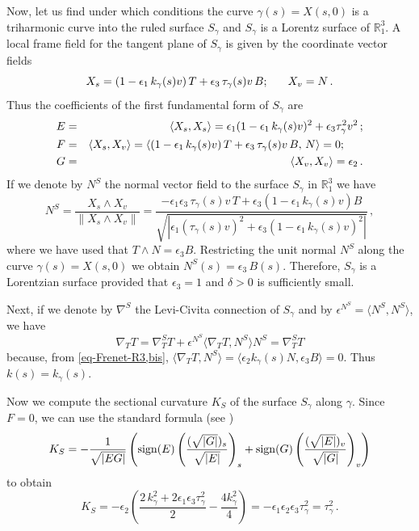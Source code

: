\documentclass[11pt]{amsart}
\theoremstyle{plain}
\theoremstyle{definition}
\numberwithin{equation}{section}
\def \R{{\mathbb R}}
\begin{document}
Now, let us find  under which conditions the curve $\gamma(s)=X(s,0)$ is a triharmonic curve into the ruled surface $S_{\gamma}$ and $S_{\gamma}$ is a Lorentz surface of $\R_1^3$.  
A local frame field for the tangent plane of $S_\gamma$ is given by the coordinate vector fields
\[
X_s =  (1 - \epsilon_1\,k_\gamma(s)v) \, T + \epsilon_3 \, \tau_\gamma(s) v\, B; \hspace{6 mm} X_v = N\,.
\]
Thus the coefficients of the first fundamental form of $S_\gamma$ are
\begin{eqnarray}\label{eq-S-firstFF}\nonumber
 E&=& \langle X_s, X_s \rangle = \epsilon_1 (1 - \epsilon_1\,k_\gamma(s)v)^2 + \epsilon_3 \tau_\gamma^2 v^2\,;\\
F &=& \langle X_s, X_v \rangle = \langle (1 - \epsilon_1\,k_\gamma(s)v) \, T + \epsilon_3 \, \tau_\gamma(s) v\, B, \, N \rangle = 0; \hspace{6 mm} \\\nonumber
G &=& \langle X_v, X_v \rangle = \epsilon_2\,.
\end{eqnarray}
If we denote by $N^S$ the normal vector field to the surface $S_\gamma$ in $\R_1^3$ we have
\[
N^S = \dfrac{X_s \wedge X_v}{\| X_s \wedge X_v \|} = \dfrac{-\epsilon_1 \epsilon_3 \, \tau_\gamma(s) v \, T + \epsilon_3 (1 - \epsilon_1\,k_\gamma(s)v) B}{\sqrt{| \epsilon_1 ( \tau_\gamma(s) v )^2 + \epsilon_3 (1 - \epsilon_1\,k_\gamma(s)v)^2 |}}\,,
\]
where we have used that $T\wedge N= \epsilon_3 B$.
Restricting the unit normal $N^S$ along the curve $\gamma(s) = X(s, 0)$ we obtain $N^S(s) = \epsilon_3 \, B(s)$. Therefore, $S_\gamma$ is a Lorentzian surface provided that $\epsilon_3=1$ and $\delta>0$ is sufficiently small.
 
Next, if we denote by $\nabla^S$  the Levi-Civita connection of $S_\gamma$ and by $\epsilon^{N^S} = \langle N^S, N^S \rangle$, we have
\[
 \nabla_T T = \nabla_T^S T + \epsilon^{N^S} \langle \nabla_T T , N^S \rangle N^S=\nabla_T^S T
 \]
because, from \eqref{eq-Frenet-R3,bis}, $\langle \nabla_T T , N^S \rangle= \langle \epsilon_2 k_\gamma(s) N, \epsilon_3 B \rangle = 0$.
Thus $k(s) = k_\gamma(s)$.


Now we compute the sectional curvature $K_S$ of the surface $S_\gamma$ along $\gamma$. Since $F = 0$, we can use the standard formula  (see \cite[p.81]{Neill})
\[
K_S = -\dfrac{1}{\sqrt{| EG |}} \left( {\rm sign}(E) \left( \dfrac{(\sqrt{|G|})_s}{\sqrt{|E|}} \right)_s+ {\rm sign}(G) \left( \dfrac{(\sqrt{|E|})_v}{\sqrt{|G|}}\right)_v \right)
\]
to obtain
\[
K_S= -\epsilon_2 \left( \dfrac{2\,k_\gamma^2 + 2 \epsilon_1 \epsilon_3 \tau_\gamma^2}{2} - \dfrac{4 k_\gamma^2}{4} \right) = - \epsilon_1 \epsilon_2 \epsilon_3 \tau_\gamma^2 = \tau_\gamma^2\,.
\]
\end{document}
